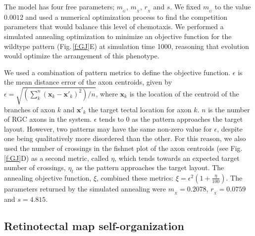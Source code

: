 \documentclass[9pt,lineno,draft]{elife}
\begin{document}
The model has four free parameters; $m_{\!_G}$, $m_{\!_X}$, $r_{\!_X}$ and $s$. We fixed $m_{\!_G}$ to the value $0.0012$ and used a numerical optimization process to find the competition parameters that would balance this level of chemotaxis.
We performed a simulated annealing optimization to minimize an objective function for the wildtype pattern (Fig.\,\ref{f:GJ}E) at simulation time 1000, reasoning that evolution would optimize the arrangement of this phenotype.

We used a combination of pattern metrics to define the objective function. $\epsilon$ is the mean distance error of the axon centroids, given by $\epsilon = \sqrt{\left(\sum_k^n (\mathbf{x}_{k} - \mathbf{x}'_{k})^2\right)/n}$,
%
%
where $\mathbf{x}_{k}$ is the location of the centroid of the branches of axon $k$ and $\mathbf{x}'_{k}$ the target tectal location for axon $k$.
$n$ is the number of RGC axons in the system.
%
$\epsilon$ tends to 0 as the pattern approaches the target layout.
However, two patterns may have the same non-zero value for $\epsilon$, despite one being qualitatively more disordered than the other.
For this reason, we also used the number of crossings in the fishnet plot of the axon centroids (see Fig.\,\ref{f:GJ}D) as a second metric, called $\eta$, which tends towards an expected target number of crossings, $\eta_t$ as the pattern approaches the target layout. The annealing objective function, $\xi$, combined these metrics: $\xi = \epsilon^2 (1+\frac{\eta}{100})$.
The parameters returned by the simulated annealing were
$m_{\!_X} = 0.2078$, $r_{\!_X} = 0.0759$ and $s = 4.815$.

\subsection*{Retinotectal map self-organization}
\end{document}

